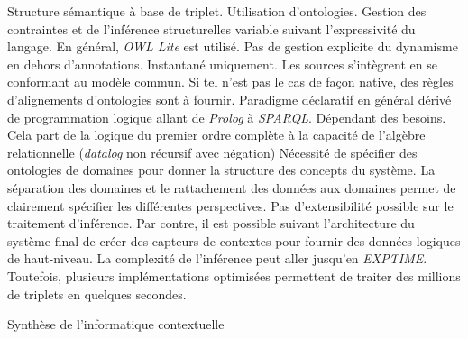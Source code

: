 \begin{table}[!ht]
\criteretabDonnee
    {Structure sémantique à base de triplet.}
    {Utilisation d'ontologies. Gestion des contraintes et de l'inférence structurelles variable suivant l'expressivité du langage. En général, \textit{OWL Lite} est utilisé.}
    {Pas de gestion explicite du dynamisme en dehors d'annotations.}
\criteretabTraitement
    {Instantané uniquement.}
    {Les sources s'intègrent en se conformant au modèle commun. Si tel n'est pas le cas de façon native, des règles d'alignements d'ontologies sont à fournir.}
    {Paradigme déclaratif en général dérivé de programmation logique allant de \textit{Prolog} à \textit{SPARQL}.}
    {Dépendant des besoins. Cela part de la logique du premier ordre complète à la capacité de l'algèbre relationnelle (\textit{datalog} non récursif avec négation)}
\criteretabAdaptabilite
    {Nécessité de spécifier des ontologies de domaines pour donner la structure des concepts du système.}
    {La séparation des domaines et le rattachement des données aux domaines permet de clairement spécifier les différentes perspectives.}
    {Pas d'extensibilité possible sur le traitement d'inférence. Par contre, il est possible suivant l'architecture du système final de créer des capteurs de contextes pour fournir des données logiques de haut-niveau.}
    {La complexité de l'inférence peut aller jusqu'en \textit{EXPTIME}. Toutefois, plusieurs implémentations optimisées permettent de traiter des millions de triplets en quelques secondes.}
\caption{Synthèse de l'informatique contextuelle}\label{tab:rw:supervision:contexte:synthese}
\end{table}